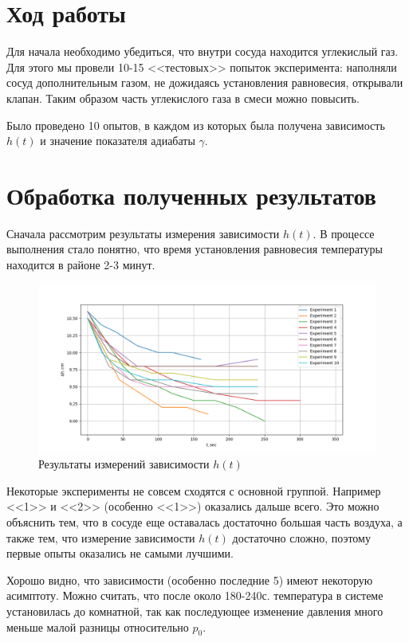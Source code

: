 \documentclass[a4paper,12pt]{report}
\begin{document}
    \section*{Ход работы}
    Для начала необходимо убедиться, что внутри сосуда находится углекислый газ. Для этого мы провели 10-15 <<тестовых>> попыток эксперимента: наполняли сосуд дополнительным газом, не дожидаясь установления равновесия, открывали клапан. Таким образом часть углекислого газа в смеси можно повысить.

    Было проведено 10 опытов, в каждом из которых была получена зависимость $h(t)$ и значение показателя адиабаты $\gamma$.

    \section*{Обработка полученных результатов}

    Сначала рассмотрим результаты измерения зависимости $h(t)$. В процессе выполнения стало понятно, что время установления равновесия температуры находится в районе 2-3 минут.

    \begin{figure}[H]
        \centering
        \includegraphics*[width=1\linewidth]{h(t).png}
        \caption{Результаты измерений зависимости $h(t)$}
    \end{figure}    

    Некоторые эксперименты не совсем сходятся с основной группой. Например <<1>> и <<2>> (особенно <<1>>) оказались дальше всего. Это можно объяснить тем, что в сосуде еще оставалась достаточно большая часть воздуха, а также тем, что измерение зависимости $h(t)$ достаточно сложно, поэтому первые опыты оказались не самыми лучшими.
    
    Хорошо видно, что зависимости (особенно последние 5) имеют некоторую асимптоту. Можно считать, что после около 180-240с. температура в системе установилась до комнатной, так как последующее изменение давления много меньше малой разницы относительно $p_0$.
\end{document}
